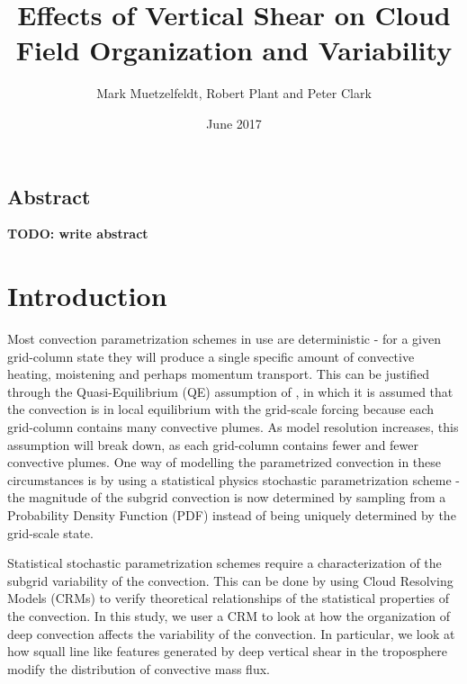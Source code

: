 \documentclass[11pt,a4paper]{article}
\title{Effects of Vertical Shear on Cloud Field Organization and Variability}
\author{Mark Muetzelfeldt, Robert Plant and  Peter Clark}
\date{June 2017}
\newcommand\todo[1]{\textbf{TODO: #1}}
\begin{document}
\maketitle

\begin{center}
\section*{Abstract}
\end{center}
\todo{write abstract}


\section{Introduction}

Most convection parametrization schemes in use are deterministic - for a given grid-column state they will produce a single specific amount of convective heating, moistening and perhaps momentum transport. This can be justified through the Quasi-Equilibrium (QE) assumption of \cite{arakawa1974interaction}, in which it is assumed that the convection is in local equilibrium with the grid-scale forcing because each grid-column contains many convective plumes. As model resolution increases, this assumption will break down, as each grid-column contains fewer and fewer convective plumes. One way of modelling the parametrized convection in these circumstances is by using a statistical physics stochastic parametrization scheme \parencite{berner2017stochastic} - the magnitude of the subgrid convection is now determined by sampling from a Probability Density Function (PDF) instead of being uniquely determined by the grid-scale state.

Statistical stochastic parametrization schemes require a characterization of the subgrid variability of the convection. This can be done by using Cloud Resolving Models (CRMs) to verify theoretical relationships of the statistical properties of the convection. In this study, we user a CRM to look at how the organization of deep convection affects the variability of the convection. In particular, we look at how squall line like features generated by deep vertical shear in the troposphere modify the distribution of convective mass flux.
\end{document}
